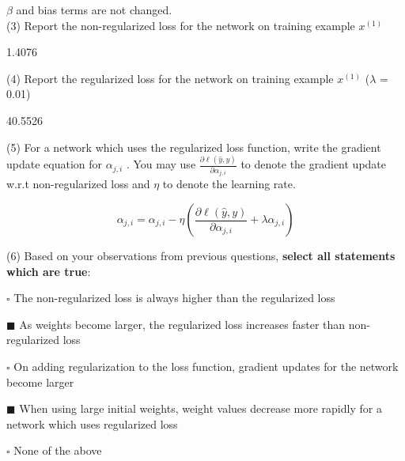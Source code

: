 $\beta$ and bias terms are not changed. \\

(3) Report the non-regularized loss for the network on training example $x^{(1)}$
\begin{tcolorbox}[fit,height=1cm, width=2cm, blank, borderline={1pt}{-2pt}]
    1.4076
\end{tcolorbox}

(4) Report the regularized loss for the network on training example $x^{(1)}$ ($\lambda$ = 0.01)
\begin{tcolorbox}[fit,height=1cm, width=2cm, blank, borderline={1pt}{-2pt}]
    40.5526
\end{tcolorbox}

(5) For a network which uses the regularized loss function, write the gradient update equation for $\alpha_{j,i}$ . You may use $\frac{\partial \ell(\hat{y},y)}{\partial \alpha_{j,i}}$ to denote the gradient update w.r.t non-regularized loss and $\eta$ to denote the learning rate.
\begin{tcolorbox}[fit,height=3cm, width=10cm, blank, borderline={1pt}{-2pt}]
    $$\alpha_{j,i} = \alpha_{j,i} - \eta\left(\frac{\partial \ell(\hat{y},y)}{\partial \alpha_{j,i}} + \lambda\alpha_{j,i}\right)$$
\end{tcolorbox}

(6) Based on your observations from previous questions, \textbf{select all statements which are true}:
\begin{list}{}
    \item $\square$ The non-regularized loss is always higher than the regularized loss
    \item $\blacksquare$ As weights become larger, the regularized loss increases faster than non-regularized loss
    \item $\square$ On adding regularization to the loss function, gradient updates for the network become larger
    \item $\blacksquare$ When using large initial weights, weight values decrease more rapidly for a network which uses regularized loss
    \item $\square$ None of the above
\end{list}